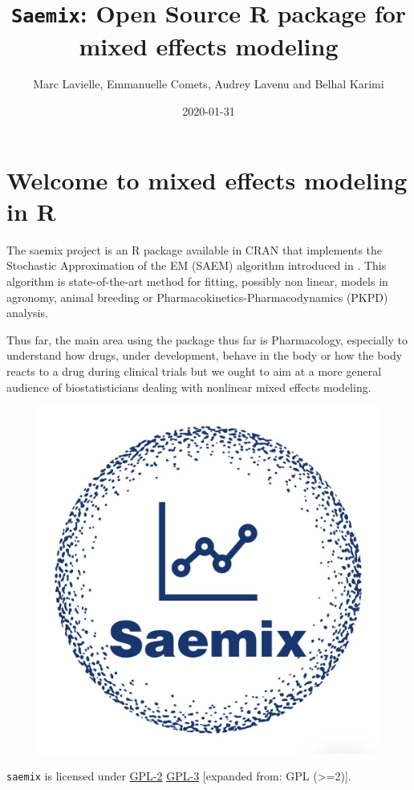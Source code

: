 \documentclass[]{book}
\title{\texttt{Saemix}: Open Source R package for mixed effects modeling}
\author{Marc Lavielle, Emmanuelle Comets, Audrey Lavenu and Belhal Karimi}
\date{2020-01-31}
\begin{document}
\maketitle

{
\hypersetup{linkcolor=black}
\setcounter{tocdepth}{1}
\tableofcontents
}
\chapter*{Welcome to mixed effects modeling in
R}\label{welcome-to-mixed-effects-modeling-in-r}

The saemix project is an R package available in CRAN that implements the
Stochastic Approximation of the EM (SAEM) algorithm introduced in
\citep{kuhn}. This algorithm is state-of-the-art method for fitting,
possibly non linear, models in agronomy, animal breeding or
Pharmacokinetics-Pharmacodynamics (PKPD) analysis.

Thus far, the main area using the package thus far is Pharmacology,
especially to understand how drugs, under development, behave in the
body or how the body reacts to a drug during clinical trials but we
ought to aim at a more general audience of biostatisticians dealing with
nonlinear mixed effects modeling.

\begin{figure}

{\centering \includegraphics[width=0.6\linewidth]{figures/logo1} 

}

\end{figure}

\texttt{saemix} is licensed under
\href{https://cran.r-project.org/web/licenses/GPL-2}{GPL-2} \textbar{}
\href{https://cran.r-project.org/web/licenses/GPL-3}{GPL-3} {[}expanded
from: GPL (\textgreater{}=2){]}.
\end{document}
